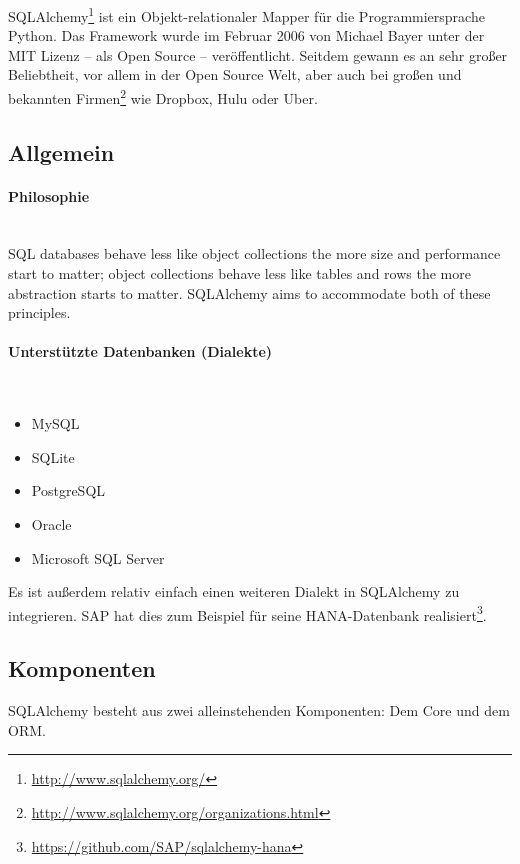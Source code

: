 SQLAlchemy\footnote{\href{http://www.sqlalchemy.org/}{http://www.sqlalchemy.org/}} ist ein Objekt-relationaler Mapper für die Programmiersprache Python. Das Framework wurde im Februar 2006 von Michael Bayer unter der MIT Lizenz – als Open Source – veröffentlicht. Seitdem gewann es an sehr großer Beliebtheit, vor allem in der Open Source Welt, aber auch bei großen und bekannten Firmen\footnote{\href{http://www.sqlalchemy.org/organizations.html}{http://www.sqlalchemy.org/organizations.html}} wie Dropbox, Hulu oder Uber.

\subsection{Allgemein}

\paragraph{Philosophie} \hspace{0pt} \\
SQL databases behave less like object collections the more size and performance start to matter; object collections behave less like tables and rows the more abstraction starts to matter. SQLAlchemy aims to accommodate both of these principles.

\paragraph{Unterstützte Datenbanken (Dialekte)} \hspace{0pt} \\
\begin{itemize}
	\item MySQL
	\item SQLite
	\item PostgreSQL
	\item Oracle
	\item Microsoft SQL Server
\end{itemize}

Es ist außerdem relativ einfach einen weiteren Dialekt in SQLAlchemy zu integrieren. SAP hat dies zum Beispiel für seine HANA-Datenbank realisiert\footnote{\href{https://github.com/SAP/sqlalchemy-hana}{https://github.com/SAP/sqlalchemy-hana}}.

\subsection{Komponenten}
SQLAlchemy besteht aus zwei alleinstehenden Komponenten: Dem Core und dem ORM.

